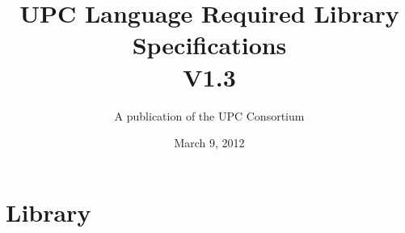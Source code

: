 

\makeindex

\title{UPC Language Required Library Specifications\\
V1.3 }

\author{A publication of the UPC Consortium}

\date {March 9, 2012}



\maketitle

\setcounter{page}{2}

\setlength {\parskip}{0ex}
\tableofcontents                                             
\setlength {\parskip}{1.3ex}
\newpage

\pagebreak

\setcounter{section}{6} %
\section{Library}

\setcounter{subsection}{2} %



\pagebreak
\printindex

